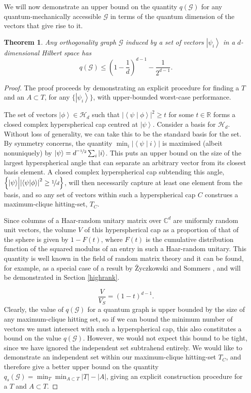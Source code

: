 \documentclass{amsart}
\newtheorem{thm}{Theorem}
\theoremstyle{definition}
\newcommand{\ket}[1]{{\left\vert{#1}\right\rangle}}
\newcommand{\braket}[2]{{\left< {#1} \middle\vert {#2}\right>}}
\newcommand{\sprod}[2]{\left|\left< {#1} \middle| {#2} \right>\right|}
\begin{document}
We will now demonstrate an upper bound on the quantity $q(\mathcal{G})$ for any quantum-mechanically accessible $\mathcal{G}$ in terms of the quantum dimension of the vectors that give rise to it.
\begin{thm}\label{main}
Any orthogonality graph $\mathcal{G}$ induced by a set of vectors $\ket{\psi_i}$ in a $d$-dimensional Hilbert space has
\begin{equation}
q(\mathcal{G}) \leq \left(1-\frac1d\right)^{d-1}-\frac{1}{2^{d-1}}.
\end{equation}
\end{thm}
\begin{proof}
The proof proceeds by demonstrating an explicit procedure for finding a $T$ and an $A\subset T$, for any $\{\ket{\psi_i}\}$, with upper-bounded worst-case performance.

The set of vectors $\ket{\phi}\in\mathcal{H}_d$ such that $\sprod{\psi}{\phi}^2\geq t$ for some $t\in\mathbb{R}$ forms a closed complex hyperspherical cap centred at $\ket{\psi}$. Consider a basis for $\mathcal{H}_d$. Without loss of generality, we can take this to be the standard basis for the set. By symmetry concerns, the quantity $\min_i \left|\braket{\psi}{i}\right|$ is maximised (albeit nonuniquely) by $\ket{\psi}=d^{\nicefrac{-1}{2}}\sum_i\ket{i}$. This puts an upper bound on the size of the largest hyperspherical angle that can separate an arbitrary vector from its closest basis element. A closed complex hyperspherical cap subtending this angle, $\left\{\ket{\psi}\middle|\sprod{\psi}{\phi}^2\geq \nicefrac{1}{d}\right\}$, will then necessarily capture at least one element from the basis, and so any set of vectors within such a hyperspherical cap $C$ construes a maximum-clique hitting-set, $T_C$.

Since columns of a Haar-random unitary matrix over $\mathbb{C}^d$ are uniformly random unit vectors, the volume $V$ of this hyperspherical cap as a proportion of that of the sphere is given by $1-F(t)$, where $F(t)$ is the cumulative distribution function of the squared  modulus of an entry in such a Haar-random unitary. This quantity is well known in the field of random matrix theory and it can be found, for example, as a special case of a result by \.{Z}yczkowski and Sommers \cite{Zycz2000}, and will be demonstrated in Section \ref{highrank}.

\begin{equation}
\frac{V}{V_S}=\left(1-t \right)^{d-1}.
\end{equation}
Clearly, the value of $q(\mathcal{G})$ for a quantum graph is upper bounded by the size of any maximum-clique hitting set, so if we can bound the minimum number of vectors we must intersect with such a hyperspherical cap, this also constitutes a bound on the value $q(\mathcal{G})$. However, we would not expect this bound to be tight, since we have ignored the independent set subtrahend entirely. We would like to demonstrate an independent set within our maximum-clique hitting-set $T_C$, and therefore give a better upper bound on the quantity $q_s(\mathcal{G})=\min_T \min_{A\subset T} |T|-|A|$, giving an explicit construction procedure for a $T$ and $A\subset T$.


\end{proof}
\end{document}
